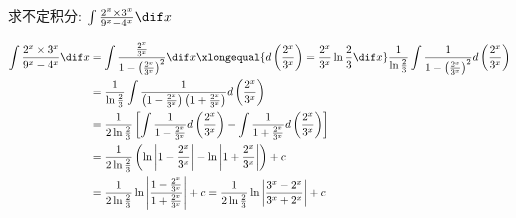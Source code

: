 \documentclass[color=green,titlestyle=hang]{elegantbook}%
\begin{document}
\begin{exercise}
求不定积分: $\int {\frac{{{2^x} \times {3^x}}}{{{9^x} - {4^x}}}} \dif x$	
\end{exercise}\begin{solution}
\begin{align*}
\int {\frac{{{2^x} \times {3^x}}}{{{9^x} - {4^x}}}} \dif x&= \int {\frac{{\frac{{{2^x}}}{{{3^x}}}}}{{1 - {{\left( {\frac{{{2^x}}}{{{3^x}}}} \right)}^2}}}} \dif x\xlongequal{{d\left( {\frac{{{2^x}}}{{{3^x}}}} \right) = \frac{{{2^x}}}{{{3^x}}}\ln \frac{2}{3}\dif x}}
\frac{1}{{\ln \frac{2}{3}}}\int {\frac{1}{{1 - {{\left( {\frac{{{2^x}}}{{{3^x}}}} \right)}^2}}}} d\left( {\frac{{{2^x}}}{{{3^x}}}} \right)\\
&= \frac{1}{{\ln \frac{2}{3}}}\int {\frac{1}{{\left( {1 - \frac{{{2^x}}}{{{3^x}}}} \right)\left( {1 + \frac{{{2^x}}}{{{3^x}}}} \right)}}} d\left( {\frac{{{2^x}}}{{{3^x}}}} \right)\\
&= \frac{1}{{2\ln \frac{2}{3}}}\left[ {\int {\frac{1}{{1 - \frac{{{2^x}}}{{{3^x}}}}}} d\left( {\frac{{{2^x}}}{{{3^x}}}} \right) - \int {\frac{1}{{1 + \frac{{{2^x}}}{{{3^x}}}}}} d\left( {\frac{{{2^x}}}{{{3^x}}}} \right)} \right]\\
&= \frac{1}{{2\ln \frac{2}{3}}}\left( {\ln \left| {1 - \frac{{{2^x}}}{{{3^x}}}} \right| - \ln \left| {1 + \frac{{{2^x}}}{{{3^x}}}} \right|} \right) + c \\
&= \frac{1}{{2\ln \frac{2}{3}}}\ln \left| {\frac{{1 - \frac{{{2^x}}}{{{3^x}}}}}{{1 + \frac{{{2^x}}}{{{3^x}}}}}} \right| + c = \frac{1}{{2\ln \frac{2}{3}}}\ln \left| {\frac{{{3^x} - {2^x}}}{{{3^x} + {2^x}}}} \right| + c
\end{align*}	
\end{solution}
\end{document}
